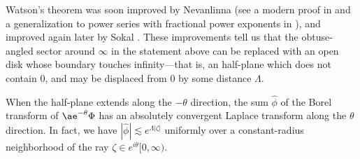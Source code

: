\documentclass{article}
\newcommand{\aexp}{\mathrm{\ae}}
\theoremstyle{definition}
\theoremstyle{plain}
\begin{document}
Watson's theorem was soon improved by Nevanlinna \cite{nevanlinna} (see a modern proof in \cite[Theorem~B.15]{nikolaev2023exact} and a generalization to power series with fractional power exponents in \cite{delabaere--rosoamanana}), and improved again later by Sokal \cite{sokal1980improvement}. These improvements tell us that the obtuse-angled sector around $\infty$ in the statement above can be replaced with an open disk whose boundary touches infinity---that is, an half-plane which does not contain $0$, and may be displaced from $0$ by some distance $\Lambda$.
\begin{center}
\end{center}
When the half-plane extends along the $-\theta$ direction, the sum $\hat{\phi}$ of the Borel transform of $\aexp^{-\theta} \Phi$ has an absolutely convergent Laplace transform along the $\theta$ direction. In fact, we have $|\hat{\phi}| \lesssim e^{\Lambda |\zeta|}$ uniformly over a constant-radius neighborhood of the ray $\zeta \in e^{i\theta}[0, \infty)$. 
\begin{center}
\end{center}
\end{document}
